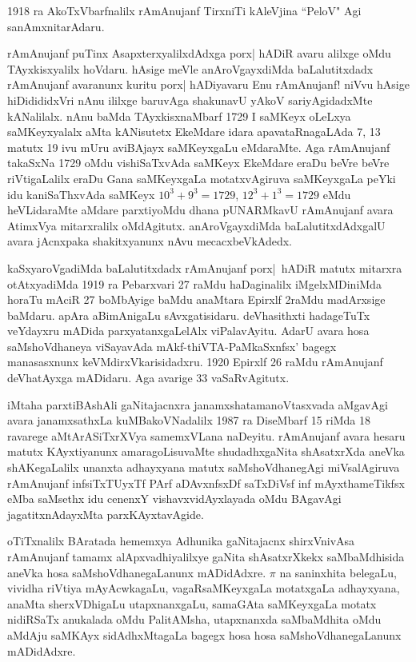 {\rm 1918} ra AkoTxVbarfnalilx rAmAnujanf TirxniTi kAleVjina ``PeloV" Agi sanAmxnitarAdaru.

rAmAnujanf puTinx AsapxterxyalilxdAdxga porx| hADiR avaru alilxge oMdu TAyxkisx\-yalilx hoVdaru. hAsige meVle anAroVgayxdiMda baLalutitxdadx rAmAnujanf avaranunx kuritu porx| hADiyavaru Enu rAmAnujanf! niVvu hAsige hiDidididxVri nAnu ililxge baruvAga shakunavU yAkoV sariyAgidadxMte kANalilalx. nAnu baMda TAyxkisx\break naMbarf {\rm 1729} I saMKeyx oLeLxya saMKeyxyalalx aMta kANisutetx EkeMdare idara apavataRnagaLAda {\rm 7, 13} matutx {\rm 19} ivu mUru aviBAjayx saMKeyxgaLu eMdaraMte. Aga rAmAnujanf takaSxNa {\rm 1729} oMdu vishiSaTxvAda saMKeyx EkeMdare eraDu beVre beVre riVtigaLalilx eraDu Gana saMKeyxgaLa motatxvAgiruva saMKeyxgaLa peYki idu kaniSaThxvAda saMKeyx $10^{3}+9^{3}=1729$, $12^{3}+1^{3}=1729$ eMdu heVLidaraMte aMdare parxtiyoMdu dhana pUNARMkavU rAmAnujanf avara AtimxVya mitarxralilx oMdAgitutx. anAroVgayxdiMda baLalutitxdAdxgalU avara jAcnxpaka shakitxyanunx nAvu mecacxbeVkAdedx.

kaSxyaroVgadiMda baLalutitxdadx rAmAnujanf porx|~hADiR matutx mitarxra otAtxyadiMda {\rm 1919} ra Pebarxvari {\rm 27} raMdu haDaginalilx iMgelxMDiniMda horaTu mAciR {\rm 27} boMbAyige baMdu anaMtara Epirxlf {\rm 2}raMdu madArxsige baMdaru. apAra aBimAnigaLu sAvxgatisidaru. deVhasithxti hadageTuTx veYdayxru mADida parxyatanx\-gaLelAlx viPala\-vAyitu. AdarU avara hosa saMshoVdhaneya viSayavAda mAkf-thiVTA-PaMkaSxnfsx' bagegx manasasxnunx keVMdirxVkarisidadxru. {\rm 1920} Epirxlf {\rm 26} raMdu rAmAnujanf deVhatAyxga mADidaru. Aga avarige {\rm 33} vaSaRvAgitutx.

iMtaha parxtiBAshAli gaNitajacnxra janamxshatamanoVtasxvada aMgavAgi avara janamxsathxLa kuMBakoVNadalilx {\rm 1987} ra DiseMbarf {\rm 15} riMda {\rm 18} ravarege aMtArASiTxrXVya samemxVLana naDeyitu. rAmAnujanf avara hesaru matutx KAyxtiyanunx amaragoLisuvaMte shudadhx\-gaNita shAsatxrXda aneVka shAKegaLalilx unanxta adhayxyana matutx saMshoVdhanegAgi miVsalAgiruva rAmAnujanf infsiTxTUyxTf PArf aDAvxnfsxDf saTxDiVsf inf mAyxthameTikfsx eMba saMsethx idu cenenxY vishavxvidAyxlayada oMdu BAgavAgi jagatitxnA\-dayxMta parxKAyxtavAgide.

oTiTxnalilx BAratada hememxya Adhunika gaNitajacnx shirxVnivAsa rAmAnujanf tamamx alApxvadhiyalilxye gaNita shAsatxrXkekx saMbaMdhisida aneVka hosa saMshoVdhanegaLanunx mADidAdxre. $\pi$ na saninxhita belegaLu, vividha riVtiya mAyAcwkagaLu, vagaRsaMKeyxgaLa motatxgaLa adhayxyana, anaMta sherxVDhigaLu utapxnanxgaLu, samaGAta saMKeyxgaLa motatx nidiRSaTx anukalada oMdu PalitAMsha, utapxnanxda saMbaMdhita oMdu aMdAju saMKAyx sidAdhxMtagaLa bagegx hosa hosa saMshoVdhanegaLanunx mADidAdxre.

